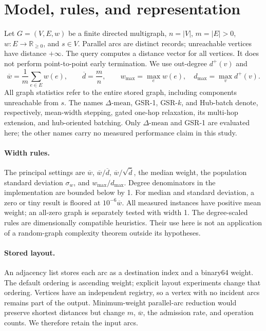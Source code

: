 \documentclass[11pt]{article}
\newcommand{\dm}{\ensuremath{\Delta\text{-mean}}}
\newcommand{\meanw}{\overline{w}}
\newcommand{\meand}{\overline{d}}
\begin{document}
\section{Model, rules, and representation}
Let $G=(V,E,w)$ be a finite directed multigraph, $n=|V|$, $m=|E|>0$,
$w:E\to\mathbb{R}_{\ge0}$, and $s\in V$. Parallel arcs are distinct records;
unreachable vertices have distance $+\infty$. The query computes a distance
vector for all vertices. It does not perform point-to-point early termination.
We use out-degree $d^+(v)$ and
\[
 \meanw=\frac1m\sum_{e\in E}w(e),\qquad
 \meand=\frac mn,\qquad
 w_{\max}=\max_e w(e),\quad d_{\max}=\max_v d^+(v).
\]
All graph statistics refer to the entire stored graph, including components
unreachable from $s$. The names \dm{}, GSR-1, GSR-$k$, and Hub-batch denote,
respectively, mean-width stepping, gated one-hop relaxation, its multi-hop
extension, and hub-oriented batching. Only \dm{} and GSR-1 are evaluated here;
the other names carry no measured performance claim in this study.

\paragraph{Width rules.}
The principal settings are $\meanw$, $\meanw/\meand$,
$\meanw/\sqrt{\meand}$, the median weight, the population standard deviation
$\sigma_w$, and $w_{\max}/d_{\max}$. Degree denominators in the implementation
are bounded below by 1. For median and standard deviation, a zero or tiny result
is floored at $10^{-6}\meanw$. All measured instances have positive mean weight;
an all-zero graph is separately tested with width 1. The degree-scaled rules
are dimensionally compatible heuristics. Their use here is not an application
of a random-graph complexity theorem outside its hypotheses.

\paragraph{Stored layout.}
An adjacency list stores each arc as a destination index and a binary64 weight.
The default ordering is ascending weight; explicit layout experiments change
that ordering. Vertices have an independent registry, so a vertex with no
incident arcs remains part of the output. Minimum-weight parallel-arc reduction
would preserve shortest distances but change $m$, $\meanw$, the admission rate,
and operation counts. We therefore retain the input arcs.
\end{document}
